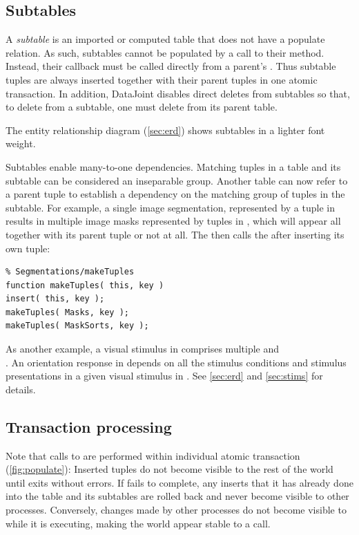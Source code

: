 \documentclass[10pt]{article}
\begin{document}
\subsection{Subtables}\label{sec:subtables}
A {\em subtable} is an imported or computed table that does not have a populate relation. As such, subtables cannot be populated by a call to their  method. Instead, their  callback must be called directly from a parent's . Thus subtable tuples are always inserted together with their parent tuples in one atomic transaction.  In addition, DataJoint disables direct deletes from subtables so that, to delete from a subtable, one must delete from its parent table. 

The entity relationship diagram (\autoref{sec:erd}) shows subtables in a lighter font weight.

Subtables enable many-to-one dependencies. Matching tuples in a table and its subtable can be considered an inseparable group. Another table can now refer to a parent tuple to establish a dependency on the matching group of tuples in the subtable.
For example, a single image segmentation, represented by a tuple in  results in multiple image masks represented by tuples in , which will appear all together with its parent tuple or not at all. The  then calls the   after inserting its own tuple:
\begin{lstlisting}
% Segmentations/makeTuples
function makeTuples( this, key )
insert( this, key ); 
makeTuples( Masks, key );
makeTuples( MaskSorts, key );
\end{lstlisting}

As another example, a visual stimulus in  comprises multiple  and \\. An orientation response in  depends on all the stimulus conditions and stimulus presentations in a given visual stimulus in . 
  See \autoref{sec:erd} and \autoref{sec:stims} for details.

\subsection{Transaction processing}
Note that calls to  are performed within individual atomic transaction (\autoref{fig:populate}): Inserted tuples do not become visible to the rest of the world until  exits without errors.   If  fails to complete, any inserts that it has already done into the table and its subtables are rolled back and never become visible to other processes. Conversely, changes made by other processes do not become visible to  while it is executing, making the world appear stable to a  call.  
\end{document}
